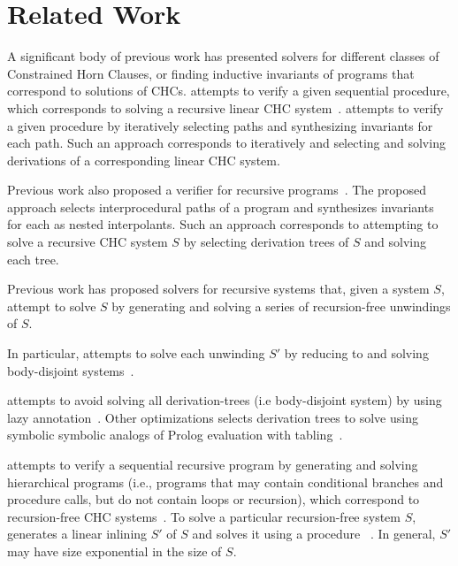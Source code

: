 \section{Related Work}
\label{sec:related-work}
A significant body of previous work has presented solvers for
different classes of Constrained Horn Clauses, or finding inductive
invariants of programs that correspond to solutions of CHCs.
\impact attempts to verify a given sequential procedure, which
corresponds to solving a recursive linear CHC
system~\cite{mcmillan06}.
%
\impact attempts to verify a given procedure by iteratively selecting
paths and synthesizing invariants for each path.
%
Such an approach corresponds to iteratively and selecting and solving
derivations of a corresponding linear CHC system.

Previous work also proposed a verifier for recursive
programs~\cite{heizmann10}.
%
The proposed approach selects interprocedural paths of a program and
synthesizes invariants for each as nested interpolants.
%
Such an approach corresponds to attempting to solve a recursive CHC
system $S$ by selecting derivation trees of $S$
and solving each tree.

Previous work has proposed solvers for recursive systems that, given a
system $S$, attempt to solve $S$ by generating and
solving a series of recursion-free unwindings of $S$.

%
In particular, \eldarica attempts to solve each unwinding
$S'$ by reducing to and solving body-disjoint systems~\cite{rummer13a,rummer13b}.
%

%
\duality attempts to avoid solving all 
derivation-trees (i.e body-disjoint system) by using lazy annotation~\cite{bjorner13}.
%
Other optimizations selects derivation trees to solve using symbolic
symbolic analogs of Prolog evaluation with
tabling~\cite{jaffar09,mcmillan14}.
%

\whale attempts to verify a sequential recursive program by generating
and solving hierarchical programs (i.e., programs that may contain
conditional branches and procedure calls, but do not contain loops or
recursion), which correspond to recursion-free CHC
systems~\cite{albarghouthi12b}.
%
To solve a particular recursion-free system $S$, \whale
generates a linear inlining $S'$ of $S$ and solves
it using a procedure \vinta~\cite{albarghouthi12a}.
%
In general, $S'$ may have size exponential in the size of
$S$.

